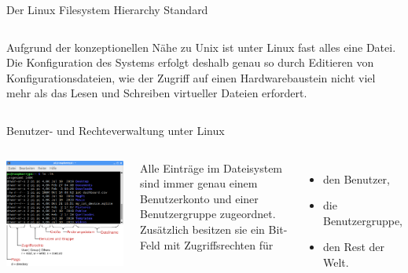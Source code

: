 {\begin{frame}[allowframebreaks]{Der Linux Filesystem Hierarchy Standard}
\begin{columns}[T]
        \parbox{\linewidth}{
            Aufgrund der konzeptionellen Nähe zu Unix ist unter Linux fast alles
            eine Datei. Die Konfiguration des Systems erfolgt deshalb genau so
            durch Editieren von Konfigurationsdateien, wie der Zugriff auf einen
            Hardwarebaustein nicht viel mehr als das Lesen und Schreiben virtueller
            Dateien erfordert.
        }
    \end{columns}
\end{frame}
}

{
\footnotesize

\begin{frame}[allowframebreaks]{Benutzer- und Rechteverwaltung unter Linux}
    \begin{columns}[onlytextwidth]
        \includegraphics[width=\textwidth]{8-linux/img/rechte-dateizugriff}

        \parbox{\linewidth}{
            Alle Einträge im Dateisystem sind immer genau einem Benutzerkonto
            und einer Benutzergruppe zugeordnet. Zusätzlich besitzen sie ein
            Bit-Feld mit Zugriffsrechten für

            \begin{itemize}
                \item den Benutzer,
                \item die Benutzergruppe,
                \item den Rest der Welt.
            \end{itemize}

}
\end{columns}
\end{frame}}
